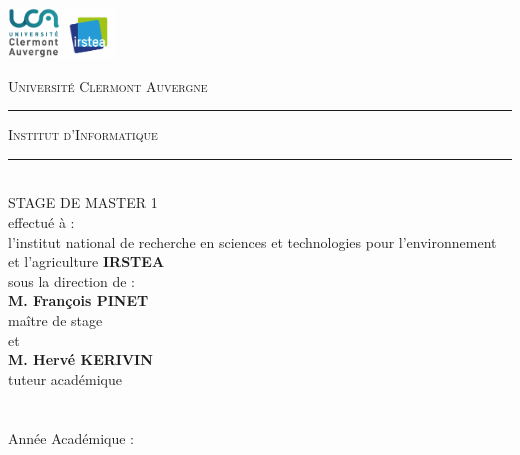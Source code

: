 \newenvironment{changemargin}[2]{\begin{list}{}{%
\setlength{\topsep}{0pt}%
\setlength{\leftmargin}{0pt}%
\setlength{\rightmargin}{0pt}%
\setlength{\listparindent}{\parindent}%
\setlength{\itemindent}{\parindent}%
\setlength{\parsep}{0pt plus 1pt}%
\addtolength{\leftmargin}{#1}%
\addtolength{\rightmargin}{#2}%
}\item }{\end{list}}
\begin{changemargin}{-2cm}{-2cm}
\newcommand{\HRule}{\rule[2mm]{10mm}{0.5mm}}
\thispagestyle{empty}
\includegraphics[height=50px]{detailPrevisionnelRapport/Logo-UCA.png}
\hspace*{\fill}
\includegraphics[height=50px]{detailPrevisionnelRapport/irstea_logo.png}
\begin{center}
    \textsc{\large Université Clermont Auvergne}\\[0.5mm]
    \HRule \textsc{ Institut d'Informatique} \HRule 
    \\[1cm]
    STAGE DE MASTER 1
    \\[1cm]
     effectué à : 
     \\
   l'institut national de recherche en sciences et technologies pour l'environnement et l'agriculture
   \textbf{IRSTEA}
   \\[0.5cm]
    sous la direction de : 
    \\[1cm]
    \textbf{M. François PINET}
    \\
    maître de stage
    \\[0.5cm]
    et
    \\[0.5cm]
  \textbf{M. Hervé KERIVIN}
    \\
    tuteur académique
    \\[2cm]
    
    {\huge \Title}
    \\[1cm]

    \textbf{\@author}
    \\[0.5cm]

    Année Académique : \@date
\end{center}
\end{changemargin}

